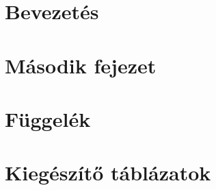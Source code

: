 \documentclass[12pt,a4paper]{article}
\begin{document}
\section{Bevezetés} \label{sec:bev}

\section{Második fejezet}













\newpage



\newpage
\appendix
\section*{Függelék}

\section{Kiegészítő táblázatok}
\end{document}
